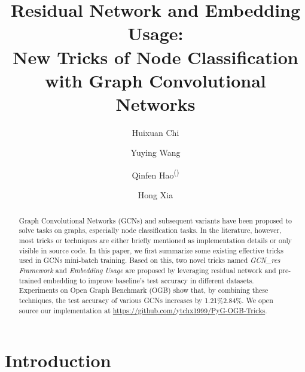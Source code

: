 \documentclass[runningheads]{llncs}
\begin{document}
\title{Residual Network and Embedding Usage:\\ New Tricks of Node Classification with Graph Convolutional Networks}
\author{Huixuan Chi \and Yuying Wang \and
Qinfen Hao\textsuperscript{(\Letter)} \and Hong Xia}






\maketitle              



\begin{abstract}

Graph Convolutional Networks (GCNs) and subsequent
variants have been proposed to solve tasks on graphs, especially node
classification tasks. In the literature, however, most tricks or
techniques are either briefly mentioned as implementation details or
only visible in source code. In this paper, we first summarize some
existing effective tricks used in GCNs mini-batch training. Based on
this, two novel tricks named \textsl{GCN\_res Framework} and \textsl{Embedding
Usage} are proposed by leveraging residual network and pre-trained embedding to improve baseline's test accuracy in
different datasets. Experiments on Open Graph Benchmark (OGB) show that,
by combining these techniques, the test accuracy of various GCNs increases by 1.21\%2.84\%. 
We open source our implementation at
 \url{https://github.com/ytchx1999/PyG-OGB-Tricks}.

\end{abstract}
\section{Introduction}\label{introduction}
\end{document}
